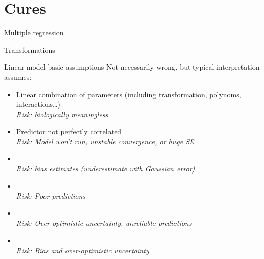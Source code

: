 \documentclass[10pt]{beamer}\usepackage[]{graphicx}\usepackage[]{color}
\begin{document}


\section{Cures}


\begin{frame}{Multiple regression}
  
\end{frame}



\begin{frame}{Transformations}

\end{frame}



\begin{frame}{Linear model basic assumptions}
Not necessarily wrong, but typical interpretation assumes:
 \begin{block}{}
     \begin{itemize}[<+->]
      \item Linear combination of parameters (including transformation, polynoms, interactions\dots)\\ \textit{Risk: biologically meaningless}
      \item Predictor not perfectly correlated \\ \textit{Risk: Model won't run, unstable convergence, or huge SE}
       \item {\color{red!20!black}{Measurement error in predictors}}\\ \textit{Risk: bias estimates (underestimate with Gaussian error)}
       \item {\color{red!50!black}{Gaussian error distribution}}\\ \textit{Risk: Poor predictions}
       \item {\color{red!70!black}{Homoscedasticity (constant error variance)}}\\ \textit{Risk: Over-optimistic uncertainty, unreliable predictions}
       \item {\color{red!99!black}{Independence of error}}\\ \textit{Risk: Bias and over-optimistic uncertainty}
     \end{itemize}
 \end{block}
\end{frame}
\end{document}
